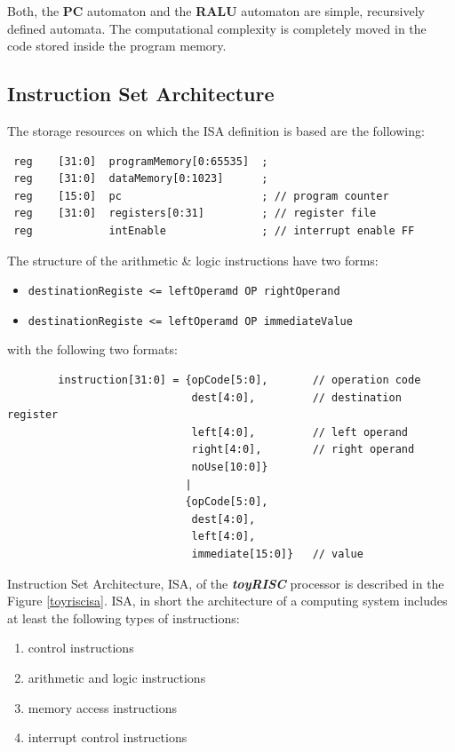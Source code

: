 \bigskip


Both, the {\bf PC} automaton and the {\bf RALU} automaton are
simple, recursively defined automata. The computational complexity
is completely moved in the code stored inside the program memory.

\subsection{Instruction Set Architecture}

The storage resources on which the ISA definition is based are the following:

\begin{verbatim}
 reg    [31:0]  programMemory[0:65535]  ;
 reg    [31:0]  dataMemory[0:1023]      ;
 reg    [15:0]  pc                      ; // program counter
 reg    [31:0]  registers[0:31]         ; // register file
 reg            intEnable               ; // interrupt enable FF
 \end{verbatim}




 The structure of the arithmetic \& logic instructions have two forms:
 \begin{itemize}
    \item {\tt destinationRegiste <= leftOperamd OP rightOperand}
    \item {\tt destinationRegiste <= leftOperamd OP immediateValue}
 \end{itemize}


\hspace{-5mm}with the  following two formats:
\begin{verbatim}
        instruction[31:0] = {opCode[5:0],       // operation code
                             dest[4:0],         // destination register
                             left[4:0],         // left operand
                             right[4:0],        // right operand
                             noUse[10:0]}
                            |
                            {opCode[5:0],
                             dest[4:0],
                             left[4:0],
                             immediate[15:0]}   // value
\end{verbatim}



Instruction Set Architecture, ISA, of the {\bf {\em toyRISC}} processor is described in
the Figure \ref{toyriscisa}. ISA, in short the architecture of a computing system includes at least the following types of instructions:
\begin{enumerate}
    \item control instructions
    \item arithmetic and logic instructions
    \item memory access instructions
    \item interrupt control instructions
\end{enumerate}

